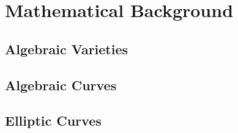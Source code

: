 \chapter{Mathematical Background}
\cite{EllipticCurvesSlides,RiemannRoch}
\cite[Page 10-15]{EllipticCurvesBook}
\section{Algebraic Varieties}
\section{Algebraic Curves}
\section{Elliptic Curves}